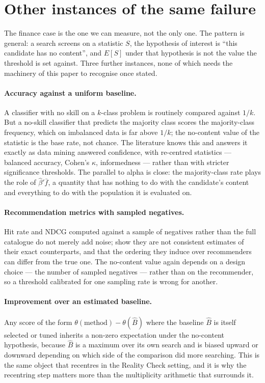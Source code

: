 \documentclass{article}
\begin{document}
\section{Other instances of the same failure}
\label{sec:instances}

The finance case is the one we can measure, not the only one. The pattern is
general: a search screens on a statistic $S$, the hypothesis of interest is
``this candidate has no content'', and $E[S]$ under that hypothesis is not the
value the threshold is set against. Three further instances, none of which
needs the machinery of this paper to recognise once stated.

\paragraph{Accuracy against a uniform baseline.} A classifier with no skill on
a $k$-class problem is routinely compared against $1/k$. But a no-skill
classifier that predicts the majority class scores the majority-class
frequency, which on imbalanced data is far above $1/k$; the no-content value of
the statistic is the base rate, not chance. The literature knows this and
answers it exactly as data mining answered confidence, with re-centred
statistics --- balanced accuracy, Cohen's $\kappa$, informedness --- rather
than with stricter significance thresholds. The parallel to alpha is close: the
majority-class rate plays the role of $\hat\beta'\bar f$, a quantity that has
nothing to do with the candidate's content and everything to do with the
population it is evaluated on.

\paragraph{Recommendation metrics with sampled negatives.} Hit rate and NDCG
computed against a sample of negatives rather than the full catalogue do not
merely add noise; \citet{krichene2020} show they are not consistent estimates
of their exact counterparts, and that the ordering they induce over
recommenders can differ from the true one. The no-content value again depends
on a design choice --- the number of sampled negatives --- rather than on the
recommender, so a threshold calibrated for one sampling rate is wrong for
another.

\paragraph{Improvement over an estimated baseline.} Any score of the form
$\theta(\text{method}) - \theta(\hat B)$ where the baseline $\hat B$ is itself
selected or tuned inherits a non-zero expectation under the no-content
hypothesis, because $\hat B$ is a maximum over its own search and is biased
upward or downward depending on which side of the comparison did more
searching. This is the same object that \citet{hansen2005} recentres in the
Reality Check setting, and it is why the recentring step matters more than the
multiplicity arithmetic that surrounds it.
\end{document}
